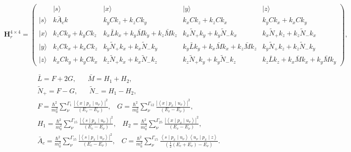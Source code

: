 \begin{landscape}

\begin{equation}
\mathbf{H}_{r}^{4\times4}=\left(\begin{array}{r|lccc}
 & |s\rangle & |x\rangle & |y\rangle & |z\rangle\\
\hline |s\rangle & k\bar{A}_{c}k & k_{y}Ck_{z}+k_{z}Ck_{y} & k_{x}Ck_{z}+k_{z}Ck_{x} & k_{y}Ck_{x}+k_{x}Ck_{y}\\
|x\rangle & k_{z}Ck_{y}+k_{y}Ck_{z} & k_{x}\bar{L}k_{x}+k_{y}\bar{M}k_{y}+k_{z}\bar{M}k_{z} & k_{x}\tilde{N}_{+}k_{y}+k_{y}\tilde{N}_{-}k_{x} & k_{x}\tilde{N}_{+}k_{z}+k_{z}\tilde{N}_{-}k_{x}\\
|y\rangle & k_{z}Ck_{x}+k_{x}Ck_{z} & k_{y}\tilde{N}_{+}k_{x}+k_{x}\tilde{N}_{-}k_{y} & k_{y}\bar{L}k_{y}+k_{x}\bar{M}k_{x}+k_{z}\bar{M}k_{z} & k_{y}\tilde{N}_{+}k_{z}+k_{z}\tilde{N}_{-}k_{y}\\
|z\rangle & k_{x}Ck_{y}+k_{y}Ck_{x} & k_{z}\tilde{N}_{+}k_{x}+k_{x}\tilde{N}_{-}k_{z} & k_{z}\tilde{N}_{+}k_{y}+k_{y}\tilde{N}_{-}k_{z} & k_{z}\bar{L}k_{z}+k_{x}\bar{M}k_{x}+k_{y}\bar{M}k_{y}\end{array}\right),\label{eq:Remote_Contributions_Hamiltonian}\end{equation}


\begin{gather}
\bar{L}=F+2G,\,\,\,\,\,\,\,\,\,\,\bar{M}=H_{1}+H_{2},\nonumber \\
\tilde{N}_{+}=F-G,\,\,\,\,\,\,\,\,\,\,\tilde{N}_{-}=H_{1}-H_{2},\nonumber \\
F=\frac{\hbar^{2}}{m_{0}^{2}}\sum_{\nu}^{\Gamma_{1}}\frac{\left|\left\langle x\mid p_{x}\mid u_{\nu}\right\rangle \right|^{2}}{\left(E_{v}-E_{\nu}\right)},\,\,\,\,\, G=\frac{\hbar^{2}}{m_{0}^{2}}\sum_{\nu}^{\Gamma_{12}}\frac{\left|\left\langle x\mid p_{x}\mid u_{\nu}\right\rangle \right|^{2}}{\left(E_{v}-E_{\nu}\right)},\label{eq:Hr4_Coefficients}\\
H_{1}=\frac{\hbar^{2}}{m_{0}^{2}}\sum_{\nu}^{\Gamma_{15}}\frac{\left|\left\langle s\mid p_{x}\mid u_{\nu}\right\rangle \right|^{2}}{\left(E_{c}-E_{\nu}\right)},\,\,\,\,\, H_{2}=\frac{\hbar^{2}}{m_{0}^{2}}\sum_{\nu}^{\Gamma_{25}}\frac{\left|\left\langle x\mid p_{x}\mid u_{\nu}\right\rangle \right|^{2}}{\left(E_{v}-E_{\nu}\right)},\nonumber \\
\bar{A}_{c}=\frac{\hbar^{2}}{m_{0}^{2}}\sum_{\nu}^{\Gamma_{15}}\frac{\left|\left\langle s\mid p_{x}\mid u_{\nu}\right\rangle \right|^{2}}{\left(E_{c}-E_{\nu}\right)},\,\,\,\,\, C=\frac{\hbar^{2}}{m_{0}^{2}}\sum_{\nu}^{\Gamma_{15}}\frac{\left\langle s\mid p_{x}\mid u_{\nu}\right\rangle \left\langle u_{\nu}\mid p_{x}\mid z\right\rangle }{\left(\frac{1}{2}\left(E_{c}+E_{v}\right)-E_{\nu}\right)}.\nonumber \end{gather}


\end{landscape}


